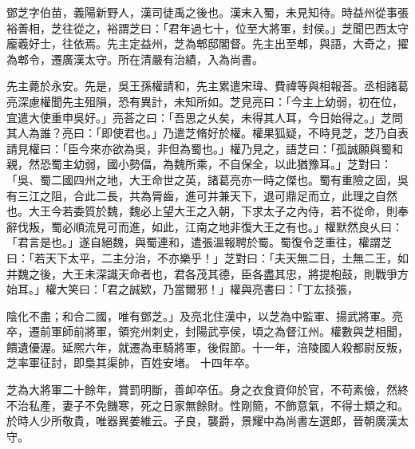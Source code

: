 \begin{pinyinscope}
 
 
 鄧芝字伯苗，義陽新野人，漢司徒禹之後也。漢末入蜀，未見知待。時益州從事張裕善相，芝往從之，裕謂芝曰：「君年過七十，位至大將軍，封侯。」芝聞巴西太守龐羲好士，往依焉。先主定益州，芝為郫邸閣督。先主出至郫，與語，大奇之，擢為郫令，遷廣漢太守。所在清嚴有治績，入為尚書。
 
 
 
 
 先主薨於永安。先是，吳王孫權請和，先主累遣宋瑋、費禕等與相報荅。丞相諸葛亮深慮權聞先主殂隕，恐有異計，未知所如。芝見亮曰：「今主上幼弱，初在位，宜遣大使重申吳好。」亮荅之曰：「吾思之乆矣，未得其人耳，今日始得之。」芝問其人為誰？亮曰：「即使君也。」乃遣芝脩好於權。權果狐疑，不時見芝，芝乃自表請見權曰：「臣今來亦欲為吳，非但為蜀也。」權乃見之，語芝曰：「孤誠願與蜀和親，然恐蜀主幼弱，國小勢偪，為魏所乘，不自保全，以此猶豫耳。」芝對曰：「吳、蜀二國四州之地，大王命世之英，諸葛亮亦一時之傑也。蜀有重險之固，吳有三江之阻，合此二長，共為脣齒，進可并兼天下，退可鼎足而立，此理之自然也。大王今若委質於魏，魏必上望大王之入朝，下求太子之內侍，若不從命，則奉辭伐叛，蜀必順流見可而進，如此，江南之地非復大王之有也。」權默然良乆曰：「君言是也。」遂自絕魏，與蜀連和，遣張溫報聘於蜀。蜀復令芝重往，權謂芝曰：「若天下太平，二主分治，不亦樂乎！」芝對曰：「夫天無二日，土無二王，如并魏之後，大王未深識天命者也，君各茂其德，臣各盡其忠，將提枹鼓，則戰爭方始耳。」權大笑曰：「君之誠欵，乃當爾邪！」權與亮書曰：「丁厷掞張，
 
 
 陰化不盡；和合二國，唯有鄧芝。」及亮北住漢中，以芝為中監軍、揚武將軍。亮卒，遷前軍師前將軍，領兖州刺史，封陽武亭侯，頃之為督江州。權數與芝相聞，饋遺優渥。延熈六年，就遷為車騎將軍，後假節。十一年，涪陵國人殺都尉反叛，芝率軍征討，即梟其渠帥，百姓安堵。
 十四年卒。
 
 
 
 
 芝為大將軍二十餘年，賞罰明斷，善卹卒伍。身之衣食資仰於官，不苟素儉，然終不治私產，妻子不免饑寒，死之日家無餘財。性剛簡，不飾意氣，不得士類之和。於時人少所敬貴，唯器異姜維云。子良，襲爵，景耀中為尚書左選郎，晉朝廣漢太守。
 
 
\end{pinyinscope}